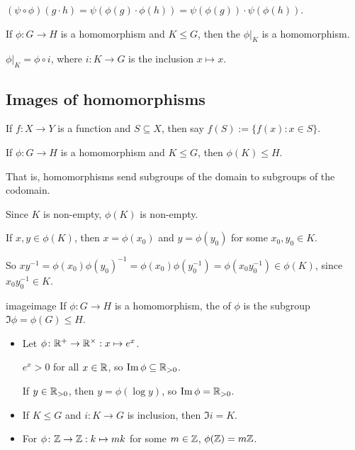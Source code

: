 \documentclass[12pt,letterpaper]{report}
\begin{document}
\begin{thmproof}
  $(\psi \circ \phi)(g \cdot h) = \psi(\phi(g) \cdot \phi(h)) = \psi(\phi(g)) \cdot \psi(\phi(h))$.
\end{thmproof}

\begin{cor}{}{}
  If $\phi \colon G \to H$ is a homomorphism and $K \leq G$, then the 
  $\phi \rvert_K$ is a homomorphism.
\end{cor}

\begin{thmproof}
  $\phi \rvert_K = \phi \circ i$, where $i \colon K \to G$ is the inclusion $x \mapsto x$.
\end{thmproof}

\pagebreak
\subsection{Images of homomorphisms}

If $f \colon X \to Y$ is a function and $S \subseteq X$, then say $f(S) := \{ f(x) : x \in S \}$.

\begin{prop}{}{}
  If $\phi \colon G \to H$ is a homomorphism and $K \leq G$, then $\phi(K) \leq H$.
\end{prop}

That is, homomorphisms send subgroups of the domain to subgroups of the codomain.

\begin{thmproof}
  Since $K$ is non-empty, $\phi(K)$ is non-empty.

  If $x, y \in \phi(K)$, then $x = \phi(x_0)$ and $y = \phi(y_0)$ for some $x_0, y_0 \in K$.

  So $xy^{-1} = \phi(x_0)\phi(y_0)^{-1} = \phi(x_0)\phi(y_0^{-1}) = \phi(x_0 y_0^{-1}) \in \phi(K)$,
  since $x_0 y_0^{-1} \in K$.
\end{thmproof}

\begin{defn}{image}{image}
  If $\phi \colon G \to H$ is a homomorphism, the  of $\phi$ is the subgroup
  $\Im \phi = \phi(G) \leq H$.
\end{defn}

\begin{ex}
  \begin{itemize}
    \item
    Let $\phi \colon \mathbb{R}^+ \to \mathbb{R}^\times : x \mapsto e^x$.

    $e^x > 0$ for all $x \in \mathbb{R}$, so $\operatorname{Im} \phi \subseteq \mathbb{R}_{> 0}$.

    If $y \in \mathbb{R}_{> 0}$, then $y = \phi(\log y)$, so $\operatorname{Im} \phi = \mathbb{R}_{> 0}$.
    \item
    If $K \leq G$ and $i \colon K \to G$ is inclusion, then $\Im i = K$.
    \item
    For $\phi \colon \mathbb{Z} \to \mathbb{Z} : k \mapsto mk$ for some $m \in \mathbb{Z}$,
    $\phi(\mathbb{Z}) = m\mathbb{Z}$.
  \end{itemize}
\end{ex}
\end{document}
